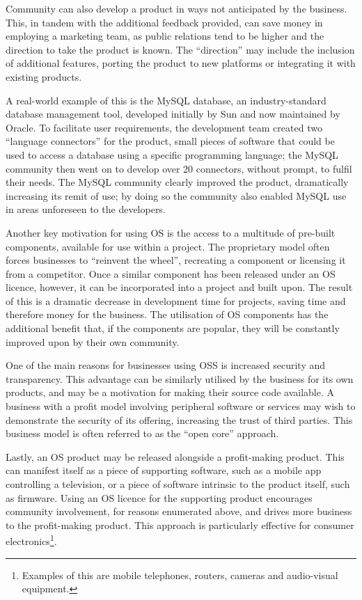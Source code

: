 \documentclass[a4paper]{article}
\begin{document}
Community can also develop a product in ways not anticipated by the business. This, in tandem with the additional feedback provided, can save money in employing a marketing team, as public relations tend to be higher\cite{wordopenoffice} and the direction to take the product is known. The “direction” may include the inclusion of additional features, porting the product to new platforms or integrating it with existing products.

A real-world example of this is the MySQL database\cite{mysql}, an industry-standard database management tool, developed initially by Sun and now maintained by Oracle. To facilitate user requirements, the development team created two “language connectors” for the product, small pieces of software that could be used to access a database using a specific programming language; the MySQL community then went on to develop over 20 connectors, without prompt, to fulfil their needs\cite{monty}. The MySQL community clearly improved the product, dramatically increasing its remit of use; by doing so the community also enabled MySQL use in areas unforeseen to the developers.

Another key motivation for using OS is the access to a multitude of pre-built components, available for use within a project. The proprietary model often forces businesses to “reinvent the wheel”, recreating a component or licensing it from a competitor. Once a similar component has been released under an OS licence, however,  it can be incorporated into a project and built upon. The result of this is a dramatic decrease in development time for projects, saving time and therefore money for the business. The utilisation of OS components has the additional benefit that, if the components are popular, they will be constantly improved upon by their own community.

One of the main reasons for businesses using OSS is increased security and transparency. This advantage can be similarly utilised by the business for its own products, and may be a motivation for making their source code available. A business with a profit model involving peripheral software or services may wish to demonstrate the security of its offering, increasing the trust of third parties. This business model is often referred to as the “open core” approach\cite{monty}.

Lastly, an OS product may be released alongside a profit-making product. This can manifest itself as a piece of supporting software, such as a mobile app controlling a television, or a piece of software intrinsic to the product itself, such as firmware. Using an OS licence for the supporting product encourages community involvement\cite{magiclantern}, for reasons enumerated above, and drives more business to the profit-making product. This approach is particularly effective for consumer electronics\footnote{Examples of this are mobile telephones, routers, cameras and audio-visual equipment.}.
\end{document}
